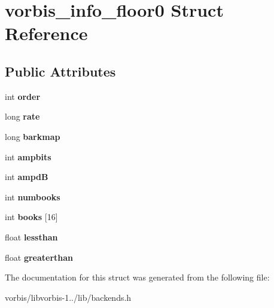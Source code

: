 \hypertarget{structvorbis__info__floor0}{\section{vorbis\+\_\+info\+\_\+floor0 Struct Reference}
\label{structvorbis__info__floor0}
}
\subsection*{Public Attributes}
\begin{DoxyCompactItemize}
\item 
\hypertarget{structvorbis__info__floor0_a84d5b9c9a1c85caeb2cdd57992d8489d}{int {\bfseries order}}\label{structvorbis__info__floor0_a84d5b9c9a1c85caeb2cdd57992d8489d}

\item 
\hypertarget{structvorbis__info__floor0_aec574189f1a7b44076c006e60f033160}{long {\bfseries rate}}\label{structvorbis__info__floor0_aec574189f1a7b44076c006e60f033160}

\item 
\hypertarget{structvorbis__info__floor0_aa0ee524de27bf41fadb08d075ac65265}{long {\bfseries barkmap}}\label{structvorbis__info__floor0_aa0ee524de27bf41fadb08d075ac65265}

\item 
\hypertarget{structvorbis__info__floor0_a01f2bbcabd4a1d82a3466598ded6ab67}{int {\bfseries ampbits}}\label{structvorbis__info__floor0_a01f2bbcabd4a1d82a3466598ded6ab67}

\item 
\hypertarget{structvorbis__info__floor0_a1896fee756462b4168a7c89b0514ef2e}{int {\bfseries ampd\+B}}\label{structvorbis__info__floor0_a1896fee756462b4168a7c89b0514ef2e}

\item 
\hypertarget{structvorbis__info__floor0_ae0b77b1ba0cc2cb5f3b5731758817540}{int {\bfseries numbooks}}\label{structvorbis__info__floor0_ae0b77b1ba0cc2cb5f3b5731758817540}

\item 
\hypertarget{structvorbis__info__floor0_a0f726482143e32b7bfcfea3851e42247}{int {\bfseries books} \mbox{[}16\mbox{]}}\label{structvorbis__info__floor0_a0f726482143e32b7bfcfea3851e42247}

\item 
\hypertarget{structvorbis__info__floor0_ad2bb0e03d446f4058d5c73a317216876}{float {\bfseries lessthan}}\label{structvorbis__info__floor0_ad2bb0e03d446f4058d5c73a317216876}

\item 
\hypertarget{structvorbis__info__floor0_a0c56a9e6c934a2d03c4755ca7f3e5de4}{float {\bfseries greaterthan}}\label{structvorbis__info__floor0_a0c56a9e6c934a2d03c4755ca7f3e5de4}

\end{DoxyCompactItemize}


The documentation for this struct was generated from the following file\+:\begin{DoxyCompactItemize}
\item 
vorbis/libvorbis-\/1../lib/backends.\+h\end{DoxyCompactItemize}
